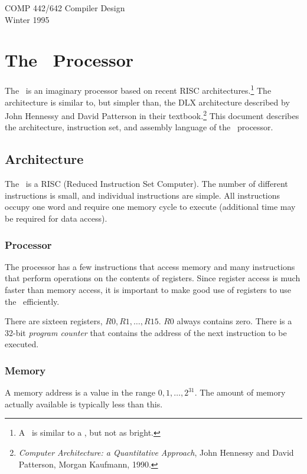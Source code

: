 \begin{center}
{\Large COMP 442/642 Compiler Design}\\[1pc]
{\large Winter 1995}\\[3pc]
\end{center}

\section{The \moon\ Processor}

The \moon\ is an imaginary processor based on recent RISC
architectures.\footnote{A \moon\ is similar to a \sun, but not as
bright.} The architecture is similar to, but simpler than, the DLX
architecture described by John Hennessy and David Patterson in their
textbook.\footnote{{\it Computer Architecture: a Quantitative
Approach\/}, John Hennessy and David Patterson, Morgan Kaufmann, 1990.}
This document describes the architecture, instruction set, and assembly
language of the \moon\ processor.

\subsection{Architecture}

The \moon\ is a RISC (Reduced Instruction Set Computer). The number of
different instructions is small, and individual instructions are simple.
All instructions occupy one word and require one memory cycle to execute
(additional time may be required for data access).

\subsubsection{Processor}

The processor has a few instructions that access memory and many
instructions that perform operations on the contents of registers. Since
register access is much faster than memory access, it is important to
make good use of registers to use the \moon\ efficiently.

There are sixteen registers, $R0,R1,\ldots,R15$. $R0$ always contains
zero. There is a 32-bit {\it program counter\/} that contains the
address of the next instruction to be executed.

\subsubsection{Memory}

A memory address is a value in the range $0,1,\ldots,2^{31}$. The amount
of memory actually available is typically less than this.

